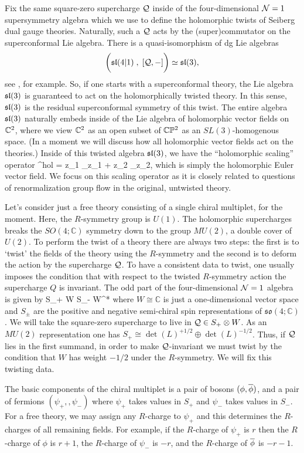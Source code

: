 \documentclass[11pt]{amsart}
\def\del{\partial}
\def\C{{\mathbb{C}}}
\def\lie#1{\ensuremath{\mathfrak{#1}}}
\begin{document}
Fix the same square-zero supercharge $\cQ$ inside of the four-dimensional $\cN=1$ supersymmetry algebra which we use to define the holomorphic twists of Seiberg dual gauge theories. 
Naturally, such a $\cQ$ acts by the (super)commutator on the superconformal Lie algebra.
There is a quasi-isomorphism of dg Lie algebras
\[
\bigg(\sl(4|1) \; , \; [\cQ, -] \bigg) \simeq \sl(3) ,
\]
see \cite{SWsuco}, for example.
So, if one starts with a superconformal theory, the Lie algebra $\sl(3)$ is guaranteed to act on the holomorphically twisted theory. 
In this sense, $\sl(3)$ is the residual superconformal symmetry of this twist. 
The entire algebra $\sl(3)$ naturally embeds inside of the Lie algebra of holomorphic vector fields on $\CC^2$,
where we view $\CC^2$ as an open subset of $\CC \PP^2$ as an $SL(3)$-homogenous space.
(In a moment we will discuss how all holomorphic vector fields act on the theories.)
Inside of this twisted algebra $\sl(3)$, we have the ``holomorphic scaling'' operator 
\beqn
\Delta^{hol} = z_1 \del_{z_1} + z_2 \del_{z_2},
\eeqn 
which is simply the holomorphic Euler vector field.  
We focus on this scaling operator as it is closely related to questions of renormalization group flow in the original, untwisted theory.

Let's consider just a free theory consisting of a single chiral multiplet, for the moment.
Here, the $R$-symmetry group is $U(1)$.
The holomorphic supercharges breaks the $SO(4;\C)$ symmetry down to the group $MU(2)$, a double cover of $U(2)$.
To perform the twist of a theory there are always two steps: the first is to `twist' the fields of the theory using the $R$-symmetry and the second is to deform the action by the supercharge $\cQ$.
To have a consistent data to twist, one usually imposes the condition that with respect to the twisted $R$-symmetry action the supercharge $Q$ is invariant.
The odd part of the four-dimensional $\cN = 1$ algebra is given by 
\beqn
S_+ \otimes W \oplus S_- \otimes W^*
\eeqn
where $W \cong \C$ is just a one-dimensional vector space and $S_{\pm}$ are the positive and negative semi-chiral spin representations of $\lie{so}(4;\C)$.
We will take the square-zero supercharge to live in $\cQ \in S_+ \otimes W$.
As an $MU(2)$ representation one has $S_+ \cong \det(L)^{+1/2} \oplus \det(L)^{-1/2}$.
Thus, if $\cQ$ lies in the first summand, in order to make $\cQ$-invariant we must twist by the condition that $W$ has weight $-1/2$ under the $R$-symmetry.
We will fix this twisting data.

The basic components of the chiral multiplet is a pair of bosons $(\phi,\Bar{\phi})$, and a pair of fermions $(\psi_+, ,\psi_-)$ where $\psi_{+}$ takes values in $S_+$ and $\psi_-$ takes values in $S_-$.
For a free theory, we may assign any $R$-charge to $\psi_+$ and this determines the $R$-charges of all remaining fields. 
For example, if the $R$-charge of $\psi_+$ is $r$ then the $R$-charge of $\phi$ is $r+1$, the $R$-charge of $\psi_-$ is $-r$, and the $R$-charge of $\Bar{\phi}$ is $-r - 1$. 
\end{document}
